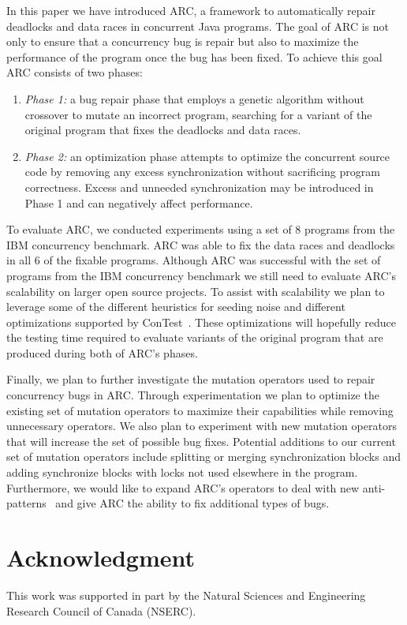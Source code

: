 \documentclass[runningheads,a4paper]{llncs}
\begin{document}
In this paper we have introduced ARC, a framework to automatically repair deadlocks and data races in concurrent Java programs. The goal of ARC is not only to ensure that a concurrency bug is repair but also to maximize the performance of the program once the bug has been fixed. To achieve this goal ARC consists of two phases: 

\begin{enumerate}
\item \emph{Phase 1:} a bug repair phase that employs a genetic algorithm without crossover to mutate an incorrect program, searching for a variant of the original program that fixes the deadlocks and data races.
\item \emph{Phase 2:} an optimization phase attempts to optimize the concurrent source code by removing any excess synchronization without sacrificing program correctness. Excess and unneeded synchronization may be introduced in Phase 1 and can negatively affect performance.
\end{enumerate}

To evaluate ARC, we conducted experiments  using a set of 8 programs from the IBM concurrency benchmark. ARC was able to fix the data races and deadlocks in all 6 of the fixable programs. Although ARC was successful with the set of programs from the IBM concurrency benchmark we still need to evaluate ARC's scalability on larger open source projects. To assist with scalability we plan to leverage some of the different heuristics for seeding noise and different optimizations supported by ConTest~\cite{KLVU10}. These optimizations will hopefully reduce the testing time required to evaluate variants of the original program that are produced during both of ARC's phases.

Finally, we plan to further investigate the mutation operators used to repair concurrency bugs in ARC. Through experimentation we plan to optimize the existing set of mutation operators to maximize their capabilities while removing unnecessary operators.  We also plan to experiment with new mutation operators that will increase the set of possible bug fixes. Potential additions to our current set of mutation operators include splitting or merging synchronization blocks and adding synchronize blocks with locks not used elsewhere in the program. Furthermore, we would like to expand ARC's operators to deal with new anti-patterns~\cite{BJ09, FKLV12, BCD06} and give ARC the ability to fix additional types of bugs. 

\section*{Acknowledgment}


This work was supported in part by the Natural Sciences and Engineering Research Council of Canada (NSERC). 



\end{document}
